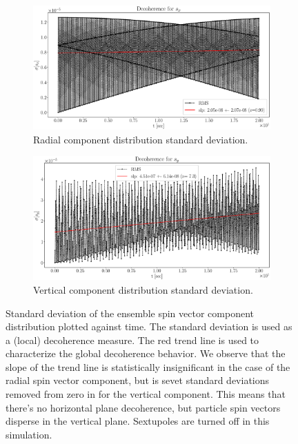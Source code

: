 \documentclass[preprint, review]{elsarticle}
\begin{document}
\begin{figure}[h]\centering
  \begin{subfigure}{\linewidth}
    \includegraphics[width=\linewidth]{img/decoh/SX_decoh_20sec_unopt.eps}
    \caption{Radial component distribution standard deviation.\label{fig:decoh:imperfect:off:hor}}
  \end{subfigure}
  \begin{subfigure}{\linewidth}
    \includegraphics[width=\linewidth]{img/decoh/SY_decoh_20sec_unopt.eps}
    \caption{Vertical component distribution standard deviation.\label{fig:decoh:imperfect:off:vert}}
  \end{subfigure}
  \caption{Standard deviation of the ensemble spin vector component distribution plotted against time.
    The standard deviation is used as a (local) decoherence measure. The red trend line is used to
    characterize the global decoherence behavior.
    We observe that the slope of the trend line is statistically insignificant in the case of the radial
    spin vector component, but is sevet standard deviations removed from zero in for the vertical component.
    This means that there's no horizontal plane decoherence, but particle spin vectors disperse in the
    vertical plane.
    Sextupoles are turned off in this simulation.\label{fig:decoh:imperfect:off}}
\end{figure}
\end{document}
